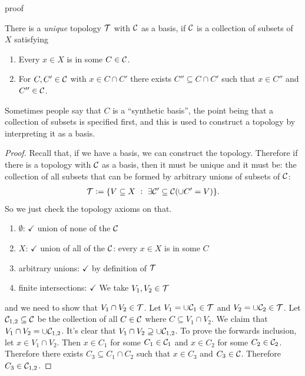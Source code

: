  proof

\begin{lemma}
  There is a {\it unique} topology $\mathcal T$ with $\mathcal C$ as a basis, if $\mathcal C$ is a collection of subsets
  of $X$ satisfying
  \begin{enumerate}
  \item Every $x \in X$ is in some $C \in \mathcal C$.
  \item For $C, C' \in \mathcal C$ with $x \in C \cap C'$ there exists $C'' \subseteq C \cap C'$ such that $x \in C''$
    and $C'' \in \mathcal C$.
\end{enumerate}
\end{lemma}

\begin{remark*}
  Sometimes people say that $C$ is a ``synthetic basis​'', the point being that a collection of subsets is
  specified first, and this is used to construct a topology by interpreting it as a basis.
\end{remark*}

\begin{proof}
  Recall that, if we have a basis, we can construct the topology. Therefore if there is a topology
  with $\mathcal C$ as a basis, then it must be unique and it must be: the collection of all subsets
  that can be formed by arbitrary unions of subsets of $\mathcal C$:
  \begin{align*}
    \mathcal T := \{V \subseteq X ~:~ \exists \mathcal C' \subseteq \mathcal C (\cup C' = V)\}.
  \end{align*}
  So we just check the topology axioms on that.

  \begin{enumerate}
  \item $\emptyset$: $\checkmark$ union of none of the $\mathcal C$
  \item $X$: $\checkmark$ union of all of the $\mathcal C$: every $x \in X$ is in some $C$
  \item arbitrary unions: $\checkmark$ by definition of $\mathcal T$
  \item finite intersections: $\checkmark$ We take $V_1, V_2 \in \mathcal T$\end{enumerate}and we need to show
  that $V_1 \cap V_2 \in \mathcal T$. Let $V_1 = \cup \mathcal C_1 \in \mathcal T$ and $V_2 = \cup \mathcal C_2 \in \mathcal T$.
  Let $\mathcal C_{1,2} \subseteq \mathcal C$ be the collection of all $C \in \mathcal C$ where $C \subseteq V_1 \cap V_2$. We
  claim that $V_1 \cap V_2 = \cup \mathcal C_{1,2}$. It's clear that $V_1 \cap V_2 \supseteq \cup \mathcal C_{1,2}$. To
  prove the forwards inclusion, let $x \in V_1 \cap V_2$. Then $x \in C_1$ for some $C_1 \in \mathcal C_1$
  and $x \in C_2$ for some $C_2 \in \mathcal C_2$. Therefore there exists $C_3 \subseteq C_1 \cap C_2$ such
  that $x \in C_3$ and $C_3 \in \mathcal C$. Therefore $C_3 \in \mathcal C_{1,2}$.
\end{proof}



